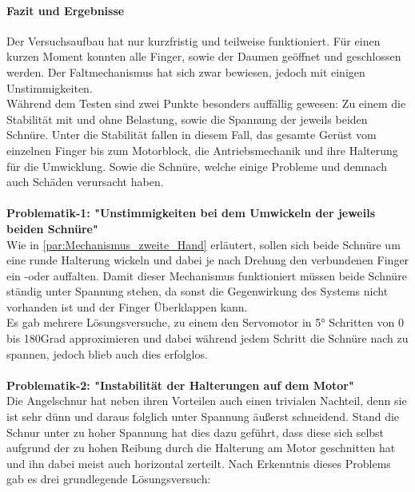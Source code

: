 \documentclass[titlepage,12pt,twoside]{article}
\begin{document}
\paragraph{Fazit und Ergebnisse}
\hfill \break
\hfill \break
Der Versuchsaufbau hat nur kurzfristig und teilweise funktioniert. Für einen kurzen Moment konnten alle Finger, sowie der Daumen geöffnet und geschlossen werden. Der Faltmechanismus hat sich zwar bewiesen, jedoch mit einigen Unstimmigkeiten. \\
Während dem Testen sind zwei Punkte besonders auffällig gewesen: Zu einem die Stabilität mit und ohne Belastung, sowie die Spannung der jeweils beiden Schnüre. Unter die Stabilität fallen in diesem Fall, das gesamte Gerüst vom einzelnen Finger 
bis zum Motorblock, die Antriebsmechanik und ihre Halterung für die Umwicklung. Sowie die Schnüre, welche einige Probleme und demnach auch Schäden verursacht haben. \\
\\
\textbf{Problematik-1: "Unstimmigkeiten bei dem Umwickeln der jeweils beiden Schnüre"} \\
Wie in \autoref{par:Mechanismus_zweite_Hand} erläutert, sollen sich beide Schnüre um eine runde Halterung wickeln und dabei je nach Drehung den verbundenen Finger ein -oder auffalten. Damit dieser Mechanismus funktioniert müssen beide Schnüre 
ständig unter Spannung stehen, da sonst die Gegenwirkung des Systems nicht vorhanden ist und der Finger Überklappen kann. \\
Es gab mehrere Lösungsversuche, zu einem den Servomotor in 5° Schritten von 0 bis 180\textdegree Grad approximieren und dabei während jedem Schritt die Schnüre nach zu spannen, jedoch blieb auch dies erfolglos. \\
\\
\textbf{Problematik-2: "Instabilität der Halterungen auf dem Motor"} \\
Die Angelschnur hat neben ihren Vorteilen auch einen trivialen Nachteil, denn sie ist sehr dünn und daraus folglich unter Spannung äußerst schneidend. Stand die Schnur unter zu hoher Spannung hat dies dazu geführt, dass diese sich 
selbst aufgrund der zu hohen Reibung durch die Halterung am Motor geschnitten hat und ihn dabei meist auch horizontal zerteilt. Nach Erkenntnis dieses Problems gab es drei grundlegende Lösungsversuch:
\end{document}

